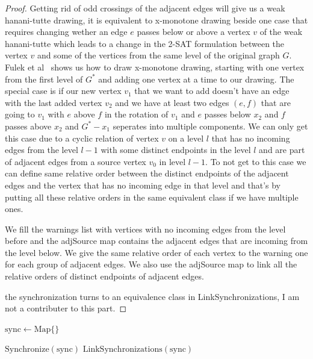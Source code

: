 \documentclass[a4paper]{article}
\begin{document}
\begin{proof}
 
    Getting rid of odd crossings of the adjacent edges will give us a weak hanani-tutte drawing, it is equivalent to x-monotone drawing beside one case that requires changing wether an edge $e$ passes below or above a vertex $v$ of 
    the weak hanani-tutte which leads to a change in the 2-SAT formulation between the vertex $v$ and some of the vertices from the same level of the original graph $G$. Fulek et al~\cite{fulek2013hanani} shows us how to draw x-monotone drawing, 
    starting with one vertex from the first level of $G^*$ and adding one vertex at a time to our drawing. The special case is if our new vertex $v_1$ that we want to add doesn't have an edge with the last added vertex $v_2$ and we have at least two edges $\left(e,f\right)$ that are going to $v_1$
    with $e$ above $f$ in the rotation of $v_1$ and $e$ passes below $x_2$ and $f$ passes above $x_2$ and $G^*-x_1$ seperates into 
    multiple components. We can only get this case due to a cyclic relation of vertex $v$ on a level $l$ that has no incoming edges from the level $l-1$ with some distinct endpoints in the level $l$ and 
    are part of adjacent edges from a source vertex $v_0$ in level $l-1$. To not get to this case we can define same relative order between the distinct endpoints of the adjacent edges and the vertex that has no incoming edge in that level and that's by putting all these 
    relative orders in the same equivalent class if we have multiple ones. 

    We fill the warnings list with vertices with no incoming edges from the level before and the adjSource map contains the adjacent edges that are incoming from the 
    level below. We give the same relative order of each vertex to the warning one for each group of adjacent edges. We also use the adjSource map to link all the relative orders 
    of distinct endpoints of adjacent edges.  

    the synchronization turns to an equivalence class in LinkSynchronizations, I am not a contributer to this part. 
\end{proof}
\begin{algorithm}
    \begin{algorithmic}[1]
            \State $\mathrm{sync} \gets \mathrm{Map}\{\}$


            \State $\mathrm{Synchronize}(\mathrm{sync})$
            \EndFor
            \State \Return $\mathrm{LinkSynchronizations}(\mathrm{sync})$
        \EndFunction
    \end{algorithmic}
\end{algorithm}
\end{document}
